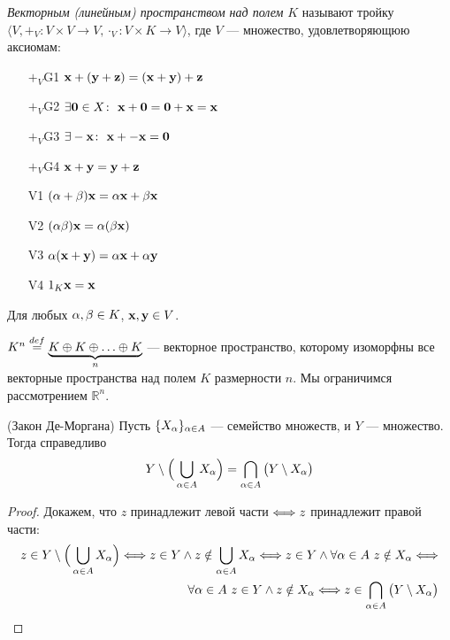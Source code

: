 \begin{definition}
    \textit{Векторным (линейным) пространством над полем} $K$ называют тройку
    $\langle V, +_V \colon V \times V \to V, \cdot_V \colon V \times K \to V
    \rangle$, где $V$ --- множество, удовлетворяющюю аксиомам:
\begin{enumerate}
    \item[$+_V$G1] $\mathbf{x} + (\mathbf{y} + \mathbf{z}) = (\mathbf{x} + \mathbf{y}) + \mathbf{z}$
    \item[$+_V$G2] $\exists \mathbf{0} \in X \colon~ \mathbf{x} + \mathbf{0} =
    \mathbf{0} + \mathbf{x} = \mathbf{x}$
    \item[$+_V$G3] $\exists -\mathbf{x} \colon~ \mathbf{x} + -\mathbf{x} = \mathbf{0}$
    \item[$+_V$G4] $\mathbf{x} + \mathbf{y} = \mathbf{y} + \mathbf{z}$
    \item[V1] $(\alpha + \beta)\mathbf{x} = \alpha\mathbf{x} + \beta\mathbf{x}$
    \item[V2] $(\alpha\beta)\mathbf{x} = \alpha(\beta\mathbf{x})$
    \item[V3] $\alpha(\mathbf{x} + \mathbf{y}) = \alpha\mathbf{x} + \alpha\mathbf{y}$
    \item[V4] $1_K \mathbf{x} = \mathbf{x}$
\end{enumerate}
Для любых $\alpha, \beta \in K$, $\mathbf{x}, \mathbf{y} \in V$.
\end{definition}
\begin{example}
    $K^n \overset{def}{\underset{}{=}} \underbrace{K \oplus K \oplus \ldots \oplus K}_{n}$
        --- векторное пространство, которому изоморфны все векторные
        пространства над полем $K$ размерности $n$. Мы ограничимся
        рассмотрением $\mathbb{R}^n$.
\end{example}

\begin{theorem}(Закон Де-Моргана)
    Пусть $\{X_\alpha\}_{\alpha \in A}$ --- семейство множеств, и $Y$ --- множество.
    Тогда справедливо
\[
    Y \setminus \Big( \bigcup_{\alpha \in A}{X_\alpha} \Big) =
    \bigcap_{\alpha \in A}{\big( Y \setminus X_\alpha \big)}
\]
\end{theorem}
\begin{proof}
    Докажем, что $z$ принадлежит левой части $\Longleftrightarrow z$ принадлежит правой
    части:
\begin{align*}
    z \in Y \setminus \Big( \bigcup_{\alpha \in A}{X_\alpha} \Big) \Longleftrightarrow
    z \in Y \wedge z \notin \bigcup_{\alpha \in A}{X_\alpha} \Longleftrightarrow
    z \in Y \wedge \forall \alpha \in A~z \notin X_\alpha \Longleftrightarrow \\
    \forall \alpha \in A~ z \in Y \wedge z \notin X_\alpha \Longleftrightarrow
    z \in \bigcap_{\alpha \in A}{\big( Y \setminus X_\alpha \big)}
\end{align*}
\end{proof}

